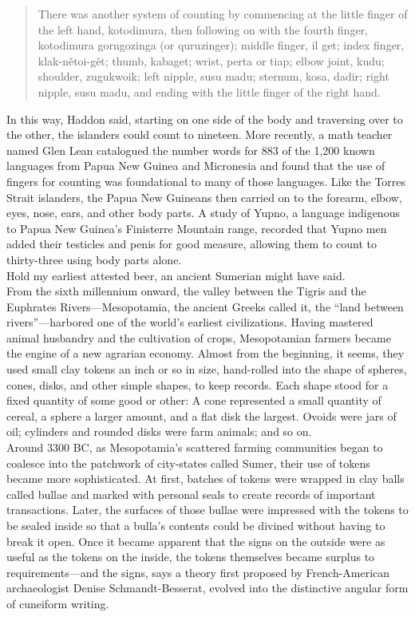 \begin{quote}
There was another system of counting by commencing at the little finger of the left hand, kotodimura, then following on with the fourth finger, kotodimura gorngozinga (or quruzinger); middle finger, il get; index finger, klak-nětoi-gět; thumb, kabaget; wrist, perta or tiap; elbow joint, kudu; shoulder, zugukwoik; left nipple, susu madu; sternum, kosa, dadir; right nipple, susu madu, and ending with the little finger of the right hand.
\end{quote}
In this way, Haddon said, starting on one side of the body and traversing over to the other, the islanders could count to nineteen. More recently, a math teacher named Glen Lean catalogued the number words for 883 of the 1,200 known languages from Papua New Guinea and Micronesia and found that the use of fingers for counting was foundational to many of those languages. Like the Torres Strait islanders, the Papua New Guineans then carried on to the forearm, elbow, eyes, nose, ears, and other body parts. A study of Yupno, a language indigenous to Papua New Guinea’s Finisterre Mountain range, recorded that Yupno men added their testicles and penis for good measure, allowing them to count to thirty-three using body parts alone.
\\
Hold my earliest attested beer, an ancient Sumerian might have said.\\
From the sixth millennium onward, the valley between the Tigris and the Euphrates Rivers—Mesopotamia, the ancient Greeks called it, the “land between rivers”—harbored one of the world’s earliest civilizations. Having mastered animal husbandry and the cultivation of crops, Mesopotamian farmers became the engine of a new agrarian economy. Almost from the beginning, it seems, they used small clay tokens an inch or so in size, hand-rolled into the shape of spheres, cones, disks, and other simple shapes, to keep records. Each shape stood for a fixed quantity of some good or other: A cone represented a small quantity of cereal, a sphere a larger amount, and a flat disk the largest. Ovoids were jars of oil; cylinders and rounded disks were farm animals; and so on.\\
Around 3300 BC, as Mesopotamia's scattered farming communities began to coalesce into the patchwork of city-states called Sumer, their use of tokens became more sophisticated. At first, batches of tokens were wrapped in clay balls called bullae and marked with personal seals to create records of important transactions. Later, the surfaces of those bullae were impressed with the tokens to be sealed inside so that a bulla's contents could be divined without having to break it open. Once it became apparent that the signs on the outside were as useful as the tokens on the inside, the tokens themselves became surplus to requirements—and the signs, says a theory first proposed by French-American archaeologist Denise Schmandt-Besserat, evolved into the distinctive angular form of cuneiform writing.\\
